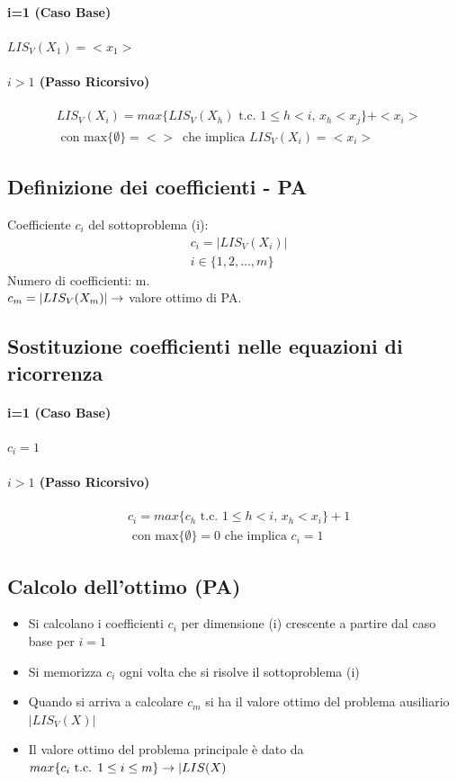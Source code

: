 \paragraph*{i=1 (Caso Base)}
$LIS_V(X_1) = <x_1>$
\paragraph*{$i>1$ (Passo Ricorsivo)}
\begin{align*}
    &LIS_V(X_i) = max\{LIS_V(X_h) \text{ t.c. } 1 \leq h < i, \, x_h < x_j\} + <x_i>\\
    &\text{ con max}\{\emptyset\} = <> \, \text{ che implica } LIS_V(X_i)=<x_i>
\end{align*}
\subsection*{Definizione dei coefficienti - PA}
Coefficiente $c_i$ del sottoproblema (i):
\begin{align*}
    &c_i = |LIS_V(X_i)|\\
    &i \in \{1,2,\dots,m\}
\end{align*}
Numero di coefficienti: m.\\
$c_m = |LIS_V(X_m)| \rightarrow$ valore ottimo di PA.
\subsection{Sostituzione coefficienti nelle equazioni di ricorrenza}
\paragraph*{i=1 (Caso Base)} $c_i = 1$
\paragraph*{$i>1$ (Passo Ricorsivo)}
\begin{align*}
    &c_i = max\{c_h \text{ t.c. } 1 \leq h < i, \, x_h < x_i\} + 1\\
    &\text{ con max}\{\emptyset\}=0 \text{ che implica } c_i = 1
\end{align*}
\subsection{Calcolo dell'ottimo (PA)}
\begin{itemize}
    \item Si calcolano i coefficienti $c_i$ per dimensione (i) crescente a partire dal
    caso base per $i=1$
    \item Si memorizza $c_i$ ogni volta che si risolve il sottoproblema (i)
    \item Quando si arriva a calcolare $c_m$ si ha il valore ottimo del problema ausiliario \ra
     $|LIS_V(X)|$
    \item Il valore ottimo del problema principale è dato da $max\{c_i \text{ t.c. }
     1 \leq i \leq m\} \rightarrow |LIS(X)$
\end{itemize}
